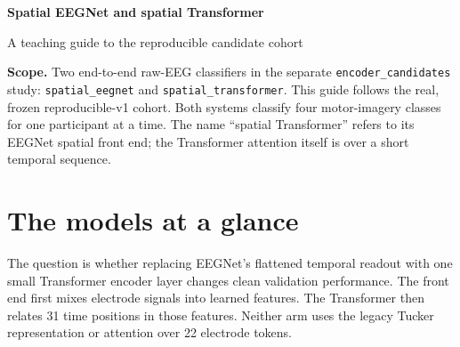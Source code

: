 \documentclass[11pt,a4paper]{article}
\newcommand{\code}[1]{{\small\nolinkurl{#1}}}
\begin{document}
{\LARGE\bfseries\color{navy} Spatial EEGNet and spatial Transformer}\par
{\large A teaching guide to the reproducible candidate cohort}\par
\textbf{Scope.} Two end-to-end raw-EEG classifiers in the separate
\code{encoder_candidates} study: \code{spatial_eegnet} and
\code{spatial_transformer}. This guide follows the real, frozen reproducible-v1
cohort. Both systems classify four motor-imagery classes for one participant
at a time. The name ``spatial Transformer'' refers to its EEGNet spatial
front end; the Transformer attention itself is over a short temporal sequence.

\section{The models at a glance}
The question is whether replacing EEGNet's flattened temporal readout with one
small Transformer encoder layer changes clean validation performance. The
front end first mixes electrode signals into learned features. The Transformer
then relates 31 time positions in those features. Neither arm uses the legacy
Tucker representation or attention over 22 electrode tokens.

\begin{center}
\end{center}
\end{document}
